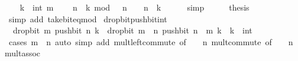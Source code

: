 \begin{isabellebody}
\ \ \isamarkupfalse%
\ {\isacartoucheopen}k\ {\isacharequal}{\kern0pt}\ int\ m{\isacartoucheclose}\ \isamarkupfalse%
\ {\isacartoucheopen}{\isacharparenleft}{\kern0pt}{}\ {\isacharcircum}{\kern0pt}\ n\ {\isacharminus}{\kern0pt}\ k{\isacharparenright}{\kern0pt}\ mod\ {}\ {\isacharcircum}{\kern0pt}\ n\ {\isacharequal}{\kern0pt}\ {}\ {\isacharcircum}{\kern0pt}\ n\ {\isacharminus}{\kern0pt}\ k{\isacartoucheclose}\isanewline
\ \ \ \ \isamarkupfalse%
\ simp\isanewline
\ \ \isamarkupfalse%
\ \isamarkupfalse%
\ {\isacharquery}{\kern0pt}thesis\isanewline
\ \ \ \ \isamarkupfalse%
\ {\isacharparenleft}{\kern0pt}simp\ add{\isacharcolon}{\kern0pt}\ take{\isacharunderscore}{\kern0pt}bit{\isacharunderscore}{\kern0pt}eq{\isacharunderscore}{\kern0pt}mod{\isacharparenright}{\kern0pt}\isanewline
{}\isamarkupfalse%
%
\endisatagproof
{\isafoldproof}%
%
\isadelimproof
\isanewline
%
\endisadelimproof
\isanewline
{}\isamarkupfalse%
\ drop{\isacharunderscore}{\kern0pt}bit{\isacharunderscore}{\kern0pt}push{\isacharunderscore}{\kern0pt}bit{\isacharunderscore}{\kern0pt}int{\isacharcolon}{\kern0pt}\isanewline
\ \ {\isacartoucheopen}drop{\isacharunderscore}{\kern0pt}bit\ m\ {\isacharparenleft}{\kern0pt}push{\isacharunderscore}{\kern0pt}bit\ n\ k{\isacharparenright}{\kern0pt}\ {\isacharequal}{\kern0pt}\ drop{\isacharunderscore}{\kern0pt}bit\ {\isacharparenleft}{\kern0pt}m\ {\isacharminus}{\kern0pt}\ n{\isacharparenright}{\kern0pt}\ {\isacharparenleft}{\kern0pt}push{\isacharunderscore}{\kern0pt}bit\ {\isacharparenleft}{\kern0pt}n\ {\isacharminus}{\kern0pt}\ m{\isacharparenright}{\kern0pt}\ k{\isacharparenright}{\kern0pt}{\isacartoucheclose}\ \ k\ {\isacharcolon}{\kern0pt}{\isacharcolon}{\kern0pt}\ int\isanewline
%
\isadelimproof
\ \ %
\endisadelimproof
%
\isatagproof
{}\isamarkupfalse%
\ {\isacharparenleft}{\kern0pt}cases\ {\isacartoucheopen}m\ {\isasymle}\ n{\isacartoucheclose}{\isacharparenright}{\kern0pt}\ {\isacharparenleft}{\kern0pt}auto\ simp\ add{\isacharcolon}{\kern0pt}\ mult{\isachardot}{\kern0pt}left{\isacharunderscore}{\kern0pt}commute\ {\isacharbrackleft}{\kern0pt}of\ {\isacharunderscore}{\kern0pt}\ {\isacartoucheopen}{}\ {\isacharcircum}{\kern0pt}\ n{\isacartoucheclose}{\isacharbrackright}{\kern0pt}\ mult{\isachardot}{\kern0pt}commute\ {\isacharbrackleft}{\kern0pt}of\ {\isacharunderscore}{\kern0pt}\ {\isacartoucheopen}{}\ {\isacharcircum}{\kern0pt}\ n{\isacartoucheclose}{\isacharbrackright}{\kern0pt}\ mult{\isachardot}{\kern0pt}assoc\isanewline

\end{isabellebody}
